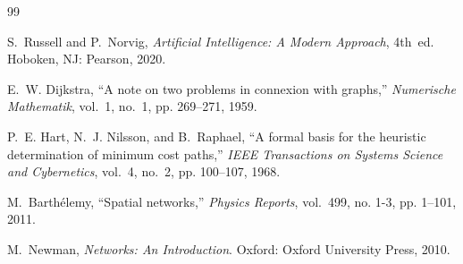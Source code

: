 \documentclass[a4paper,10pt,twocolumn]{article}
\begin{document}
\begin{thebibliography}{99}

S.~Russell and P.~Norvig,
\emph{Artificial Intelligence: A Modern Approach}, 4th~ed.
Hoboken, NJ: Pearson, 2020.

E.~W. Dijkstra,
``A note on two problems in connexion with graphs,''
\emph{Numerische Mathematik}, vol.~1, no.~1, pp. 269--271, 1959.

P.~E. Hart, N.~J. Nilsson, and B.~Raphael,
``A formal basis for the heuristic determination of minimum cost paths,''
\emph{IEEE Transactions on Systems Science and Cybernetics}, vol.~4, no.~2, pp. 100--107, 1968.

M.~Barthélemy,
``Spatial networks,''
\emph{Physics Reports}, vol.~499, no. 1-3, pp. 1--101, 2011.

M.~Newman,
\emph{Networks: An Introduction}.
Oxford: Oxford University Press, 2010.

\end{thebibliography}
\end{document}
